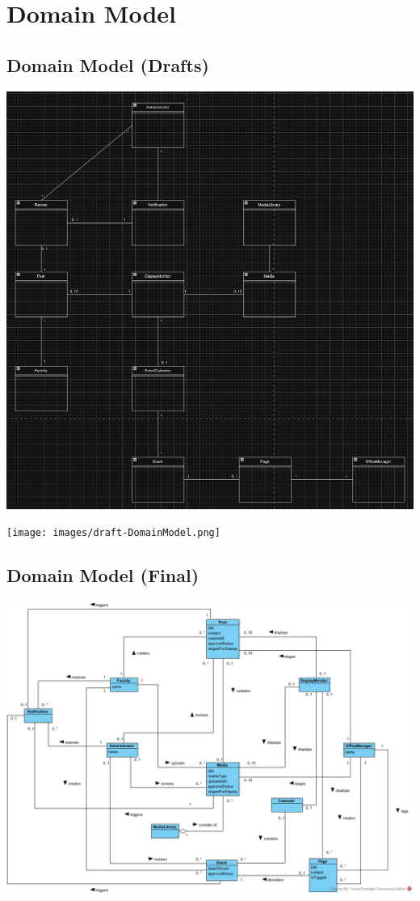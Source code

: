 \documentclass{article}
\begin{document}
\section{Domain Model}
    \subsection{Domain Model (Drafts)}
        \includegraphics[scale=0.9]{images/Initial Domain Model.png}
        \label{fig:Domain Model Draft (version 1)}
    
        \texttt{[image: images/draft-DomainModel.png]}
        \label{fig:Domain Model Draft (version 2}
    
    \subsection{Domain Model (Final)}
     \includegraphics[scale=0.45]{images/DomainModel.jpg}
        \label{fig:Final version of the Domain Model}
        
\end{document}
